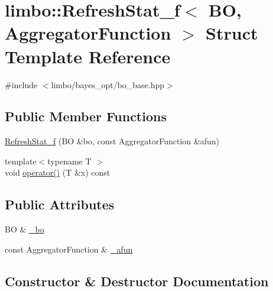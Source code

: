 \hypertarget{structlimbo_1_1_refresh_stat__f}{}\section{limbo\+:\+:Refresh\+Stat\+\_\+f$<$ B\+O, Aggregator\+Function $>$ Struct Template Reference}
\label{structlimbo_1_1_refresh_stat__f}


{\ttfamily \#include $<$limbo/bayes\+\_\+opt/bo\+\_\+base.\+hpp$>$}

\subsection*{Public Member Functions}
\begin{DoxyCompactItemize}
\item 
\hyperlink{structlimbo_1_1_refresh_stat__f_aa457d1c9101974999487052fddec098c}{Refresh\+Stat\+\_\+f} (B\+O \&bo, const Aggregator\+Function \&afun)
\item 
{\footnotesize template$<$typename T $>$ }\\void \hyperlink{structlimbo_1_1_refresh_stat__f_a24498c1e97e8aa89a8180422a3ad9109}{operator()} (T \&x) const 
\end{DoxyCompactItemize}
\subsection*{Public Attributes}
\begin{DoxyCompactItemize}
\item 
B\+O \& \hyperlink{structlimbo_1_1_refresh_stat__f_ad94ccf3c46dbed8e9f8ab573af8fb258}{\+\_\+bo}
\item 
const Aggregator\+Function \& \hyperlink{structlimbo_1_1_refresh_stat__f_af02fdc84a4066c199d26e823b9887531}{\+\_\+afun}
\end{DoxyCompactItemize}


\subsection{Constructor \& Destructor Documentation}
\hypertarget{structlimbo_1_1_refresh_stat__f_aa457d1c9101974999487052fddec098c}{}
